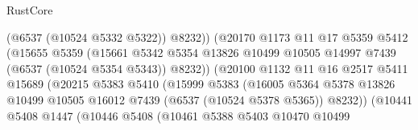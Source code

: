 \begin{lexlean}{RustCore}
\begin{coremodule}
                                        (@6537 (@10524 @5332 @5322))
                                        @8232))
                                    (@20170
                                      @1173
                                      @11
                                      @17
                                      @5359
                                      @5412
                                      (@15655
                                        @5359
                                        (@15661
                                          @5342
                                          @5354
                                          @13826
                                          @10499
                                          @10505
                                          @14997
                                          @7439
                                          (@6537 (@10524 @5354 @5343))
                                          @8232))
                                      (@20100
                                        @1132
                                        @11
                                        @16
                                        @2517
                                        @5411
                                        @15689
                                        (@20215
                                          @5383
                                          @5410
                                          (@15999
                                            @5383
                                            (@16005
                                              @5364
                                              @5378
                                              @13826
                                              @10499
                                              @10505
                                              @16012
                                              @7439
                                              (@6537 (@10524 @5378 @5365))
                                              @8232))
                                          (@10441
                                            @5408
                                            @1447
                                            (@10446
                                              @5408
                                              (@10461
                                                @5388
                                                @5403
                                                @10470
                                                @10499

\end{coremodule}
\end{lexlean}
